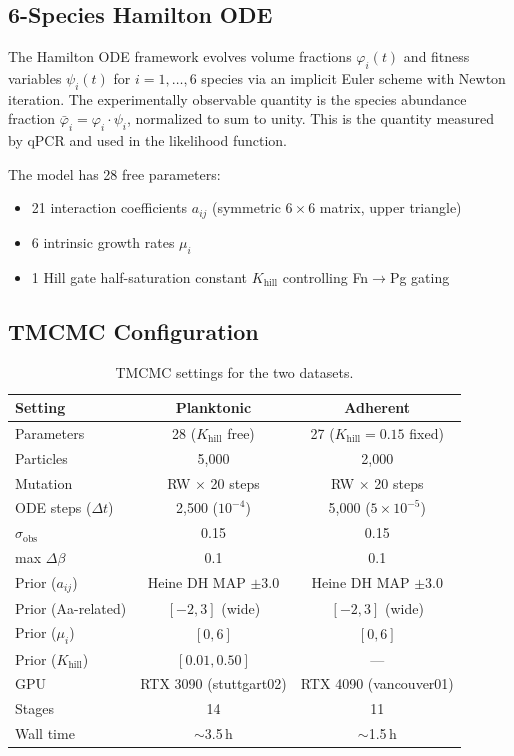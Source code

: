 \documentclass[11pt,a4paper]{article}
\begin{document}
\subsection{6-Species Hamilton ODE}

The Hamilton ODE framework \cite{hamilton_biofilm} evolves volume fractions
$\varphi_i(t)$ and fitness variables $\psi_i(t)$ for $i = 1, \ldots, 6$ species
via an implicit Euler scheme with Newton iteration.
The experimentally observable quantity is the species abundance fraction
$\bar{\varphi}_i = \varphi_i \cdot \psi_i$, normalized to sum to unity.
This is the quantity measured by qPCR and used in the likelihood function.

The model has 28 free parameters:
\begin{itemize}
\item 21 interaction coefficients $a_{ij}$ (symmetric $6 \times 6$ matrix, upper triangle)
\item 6 intrinsic growth rates $\mu_i$
\item 1 Hill gate half-saturation constant $K_\mathrm{hill}$ controlling
      Fn$\to$Pg gating
\end{itemize}

\subsection{TMCMC Configuration}

\begin{table}[H]\centering\small
\caption{TMCMC settings for the two datasets.}
\label{tab:tmcmc_config}
\begin{tabular}{lcc}
\toprule
Setting & Planktonic & Adherent \\
\midrule
Parameters & 28 ($K_\mathrm{hill}$ free) & 27 ($K_\mathrm{hill}=0.15$ fixed) \\
Particles & 5{,}000 & 2{,}000 \\
Mutation & RW $\times$ 20 steps & RW $\times$ 20 steps \\
ODE steps ($\Delta t$) & 2{,}500 ($10^{-4}$) & 5{,}000 ($5\times10^{-5}$) \\
$\sigma_\mathrm{obs}$ & 0.15 & 0.15 \\
max $\Delta\beta$ & 0.1 & 0.1 \\
Prior ($a_{ij}$) & Heine DH MAP $\pm 3.0$ & Heine DH MAP $\pm 3.0$ \\
Prior (Aa-related) & $[-2, 3]$ (wide) & $[-2, 3]$ (wide) \\
Prior ($\mu_i$) & $[0, 6]$ & $[0, 6]$ \\
Prior ($K_\mathrm{hill}$) & $[0.01, 0.50]$ & --- \\
GPU & RTX 3090 (stuttgart02) & RTX 4090 (vancouver01) \\
Stages & 14 & 11 \\
Wall time & $\sim$3.5\,h & $\sim$1.5\,h \\
\bottomrule
\end{tabular}
\end{table}
\end{document}
